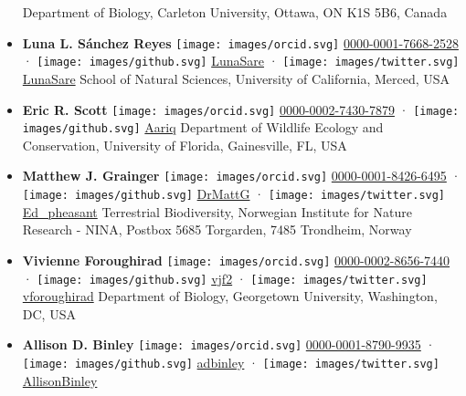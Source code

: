\begin{itemize}
  Department of Biology, Carleton University, Ottawa, ON K1S 5B6, Canada
\item
  \textbf{Luna L. Sánchez Reyes}
  \texttt{[image: images/orcid.svg]}
  \href{https://orcid.org/0000-0001-7668-2528}{0000-0001-7668-2528}
  · \texttt{[image: images/github.svg]}
  \href{https://github.com/LunaSare}{LunaSare}
  · \texttt{[image: images/twitter.svg]}
  \href{https://twitter.com/LunaSare}{LunaSare}
  School of Natural Sciences, University of California, Merced, USA
\item
  \textbf{Eric R. Scott}
  \texttt{[image: images/orcid.svg]}
  \href{https://orcid.org/0000-0002-7430-7879}{0000-0002-7430-7879}
  · \texttt{[image: images/github.svg]}
  \href{https://github.com/Aariq}{Aariq}
  Department of Wildlife Ecology and Conservation, University of Florida, Gainesville, FL, USA
\item
  \textbf{Matthew J. Grainger}
  \texttt{[image: images/orcid.svg]}
  \href{https://orcid.org/0000-0001-8426-6495}{0000-0001-8426-6495}
  · \texttt{[image: images/github.svg]}
  \href{https://github.com/DrMattG}{DrMattG}
  · \texttt{[image: images/twitter.svg]}
  \href{https://twitter.com/Ed_pheasant}{Ed\_pheasant}
  Terrestrial Biodiversity, Norwegian Institute for Nature Research - NINA, Postbox 5685 Torgarden, 7485 Trondheim, Norway
\item
  \textbf{Vivienne Foroughirad}
  \texttt{[image: images/orcid.svg]}
  \href{https://orcid.org/0000-0002-8656-7440}{0000-0002-8656-7440}
  · \texttt{[image: images/github.svg]}
  \href{https://github.com/vjf2}{vjf2}
  · \texttt{[image: images/twitter.svg]}
  \href{https://twitter.com/vforoughirad}{vforoughirad}
  Department of Biology, Georgetown University, Washington, DC, USA
\item
  \textbf{Allison D. Binley}
  \texttt{[image: images/orcid.svg]}
  \href{https://orcid.org/0000-0001-8790-9935}{0000-0001-8790-9935}
  · \texttt{[image: images/github.svg]}
  \href{https://github.com/adbinley}{adbinley}
  · \texttt{[image: images/twitter.svg]}
  \href{https://twitter.com/AllisonBinley}{AllisonBinley}

\end{itemize}
